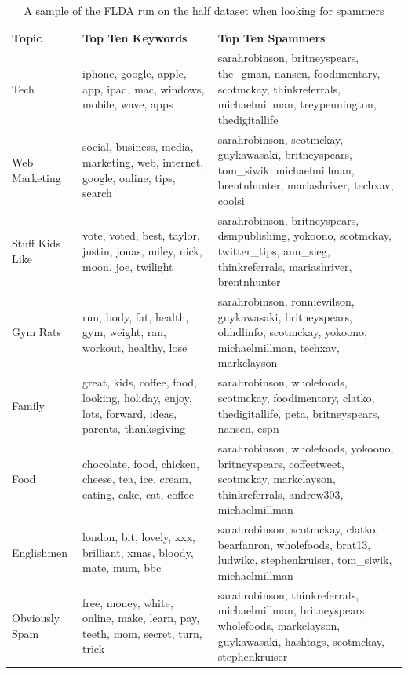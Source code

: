 \documentclass[a4paper]{article}
\begin{document}
\begin{table}[h]
  \centering %
  \begin{tabular}{ |l|l|l| }
    \hline
    Topic & Top Ten Keywords & Top Ten Spammers \\
    \hline
    \hline
    Tech & iphone, google, apple, app, ipad, mac, windows, mobile, wave, apps & sarahrobinson, britneyspears, the\_gman, nansen, foodimentary, scotmckay, thinkreferrals, michaelmillman, treypennington, thedigitallife \\
    Web Marketing & social, business, media, marketing, web, internet, google, online, tips, search & sarahrobinson, scotmckay, guykawasaki, britneyspears, tom\_siwik, michaelmillman, brentnhunter, mariashriver, techxav, coolsi \\
    Stuff Kids Like & vote, voted, best, taylor, justin, jonas, miley, nick, moon, joe, twilight & sarahrobinson, britneyspears, dsmpublishing, yokoono, scotmckay, twitter\_tips, ann\_sieg, thinkreferrals, mariashriver, brentnhunter \\
    Gym Rats & run, body, fat, health, gym, weight, ran, workout, healthy, lose & sarahrobinson, ronniewilson, guykawasaki, britneyspears, ohhdlinfo, scotmckay, yokoono, michaelmillman, techxav, markclayson \\
    Family & great, kids, coffee, food, looking, holiday, enjoy, lots, forward, ideas, parents, thanksgiving & sarahrobinson, wholefoods, scotmckay, foodimentary, clatko, thedigitallife, peta, britneyspears, nansen, espn \\
    Food & chocolate, food, chicken, cheese, tea, ice, cream, eating, cake, eat, coffee & sarahrobinson, wholefoods, yokoono, britneyspears, coffeetweet, scotmckay, markclayson, thinkreferrals, andrew303, michaelmillman \\
    Englishmen & london, bit, lovely, xxx, brilliant, xmas, bloody, mate, mum, bbc & sarahrobinson, scotmckay, clatko, bearfanron, wholefoods, brat13, ludwikc, stephenkruiser, tom\_siwik, michaelmillman \\
    Obviously Spam & free, money, white, online, make, learn, pay, teeth, mom, secret, turn, trick & sarahrobinson, thinkreferrals, michaelmillman, britneyspears, wholefoods, markclayson, guykawasaki, hashtags, scotmckay, stephenkruiser \\
    \hline
  \end{tabular}
  \caption{A sample of the FLDA run on the half dataset when looking for spammers}
  \label{tab:flda_half}
\end{table}
\end{document}
